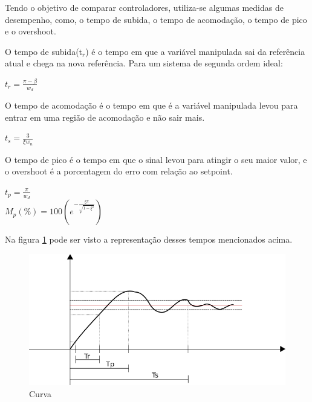 \documentclass[a4paper,12pt]{article}
\begin{document}
\hspace{4ex}Tendo o objetivo de comparar controladores, utiliza-se algumas medidas de desempenho, como, o tempo de subida, o tempo de acomodação, o tempo de pico e o overshoot.

\hspace{4ex}O tempo de subida(t$_r$) é o tempo em que a variável manipulada sai da referência atual e chega na nova referência. Para um sistema de segunda ordem ideal:

\begin{center}
$ t_r = \frac{\pi - \beta}{w_d} $
\end{center} 

\hspace{4ex}O tempo de acomodação é o tempo em que é a variável manipulada levou para entrar em uma região de acomodação e não sair mais.

\begin{center}
$ t_s=\frac{3}{\xi w_n} $
\end{center}

\hspace{4ex}O tempo de pico é o tempo em que o sinal levou para atingir o seu maior valor, e o overshoot é a porcentagem do erro com relação ao setpoint.

\begin{center}
$ t_p=\frac{\pi}{w_d} $\\
$ M_p(\%)=100( e^{- \frac{\xi\pi}{\sqrt{1-\xi^{2}}} } ) $
\end{center}

Na figura \ref{curva} pode ser visto a representação desses tempos mencionados acima.

\begin{figure}[H]
\centering
\includegraphics[width=15cm]{fotosLab3/ref.png}
\caption{Curva}
\label{curva}
\end{figure}
\end{document}
